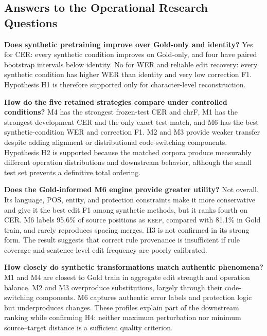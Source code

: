 \documentclass[12pt, a4paper, twoside, openany]{report}
\begin{document}
\subsection{Answers to the Operational Research Questions}

\begin{description}[leftmargin=1.35cm, style=nextline]
	\item[\textbf{RQ1}] \textbf{Does synthetic pretraining improve over Gold-only and identity?} Yes for CER: every synthetic condition improves on Gold-only, and four have paired bootstrap intervals below identity. No for WER and reliable edit recovery: every synthetic condition has higher WER than identity and very low correction F1. Hypothesis H1 is therefore supported only for character-level reconstruction.

	\item[\textbf{RQ2}] \textbf{How do the five retained strategies compare under controlled conditions?} M4 has the strongest frozen-test CER and chrF, M1 has the strongest development CER and the only exact test match, and M6 has the best synthetic-condition WER and correction F1. M2 and M3 provide weaker transfer despite adding alignment or distributional code-switching components. Hypothesis H2 is supported because the matched corpora produce measurably different operation distributions and downstream behavior, although the small test set prevents a definitive total ordering.

	\item[\textbf{RQ3}] \textbf{Does the Gold-informed M6 engine provide greater utility?} Not overall. Its language, POS, entity, and protection constraints make it more conservative and give it the best edit F1 among synthetic methods, but it ranks fourth on CER. M6 labels 95.6\% of source positions as \textsc{keep}, compared with 81.1\% in Gold train, and rarely reproduces spacing merges. H3 is not confirmed in its strong form. The result suggests that correct rule provenance is insufficient if rule coverage and sentence-level edit frequency are poorly calibrated.

	\item[\textbf{RQ4}] \textbf{How closely do synthetic transformations match authentic phenomena?} M1 and M4 are closest to Gold train in aggregate edit strength and operation balance. M2 and M3 overproduce substitutions, largely through their code-switching components. M6 captures authentic error labels and protection logic but underproduces changes. These profiles explain part of the downstream ranking while confirming H4: neither maximum perturbation nor minimum source--target distance is a sufficient quality criterion.


\end{description}
\end{document}
